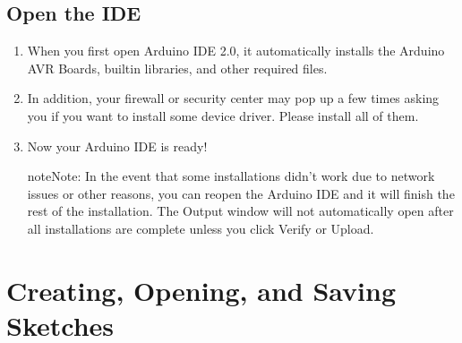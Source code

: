 \documentclass[a4paper,11pt,english]{sphinxmanual}
\begin{document}
\subsection{Open the IDE}
\label{\detokenize{Get_Started_with_Arduino/Install_Arduino_IDE:open-the-ide}}\begin{enumerate}
%
\item {} 
\sphinxAtStartPar
When you first open Arduino IDE 2.0, it automatically installs the Arduino AVR Boards, built\sphinxhyphen{}in libraries, and other required files.

\noindent{}

\item {} 
\sphinxAtStartPar
In addition, your firewall or security center may pop up a few times asking you if you want to install some device driver. Please install all of them.

\noindent{}

\item {} 
\sphinxAtStartPar
Now your Arduino IDE is ready!

\begin{sphinxadmonition}{note}{Note:}
\sphinxAtStartPar
In the event that some installations didn’t work due to network issues or other reasons, you can reopen the Arduino IDE and it will finish the rest of the installation. The Output window will not automatically open after all installations are complete unless you click Verify or Upload.
\end{sphinxadmonition}

\end{enumerate}

\sphinxstepscope


\section{Creating, Opening, and Saving Sketches}
\label{\detokenize{Get_Started_with_Arduino/Creating_Opening_Saving_Sketches:creating-opening-and-saving-sketches}}\label{\detokenize{Get_Started_with_Arduino/Creating_Opening_Saving_Sketches::doc}}
\end{document}
